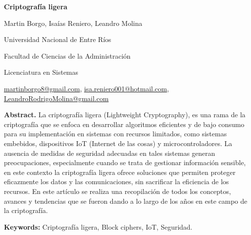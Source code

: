 \documentclass[a4paper,10pt]{article}
\begin{document}
	\pagestyle{empty}
	\begin{titlepage}
		\centering
		\vspace*{1.5cm}
		{\fontsize{14}{17}\bfseries Criptografía ligera\par}
		{\small Martin Borgo, Isaías Reniero, Leandro Molina\par}
		{\normalsize Universidad Nacional de Entre Ríos\par}
		{\normalsize Facultad de Ciencias de la Administración\par}
		{\normalsize Licenciatura en Sistemas\par}
		{\small \href{mailto:martinborgo8@gmail.com}{martinborgo8@gmail.com}, \href{mailto:isa.reniero001@hotmail.com}{isa.reniero001@hotmail.com}, \href{mailto:LeandroRodrigoMolina@gmail.com}{LeandroRodrigoMolina@gmail.com}\par}
		{\small \justify\textbf{Abstract.} La criptografía ligera (Lightweight Cryptography), es una rama de la criptografía que se enfoca en desarrollar algoritmos eficientes y de bajo consumo para su implementación en sistemas con recursos limitados, como sistemas embebidos, dispositivos IoT (Internet de las cosas) y microcontroladores. La ausencia de medidas de seguridad adecuadas en tales sistemas generan preocupaciones, especialmente cuando se trata de gestionar información sensible, en este contexto la criptografía ligera ofrece soluciones que permiten proteger eficazmente los datos y las comunicaciones, sin sacrificar la eficiencia de los recursos. En este artículo se realiza una recopilación de todos los conceptos, avances y tendencias que se fueron dando a lo largo de los años en este campo de la criptografía.\par}
		
		{\small \justify\textbf{Keywords:} Criptografía ligera, Block ciphers, IoT, Seguridad. \par}
	\end{titlepage}
	
\end{document}
